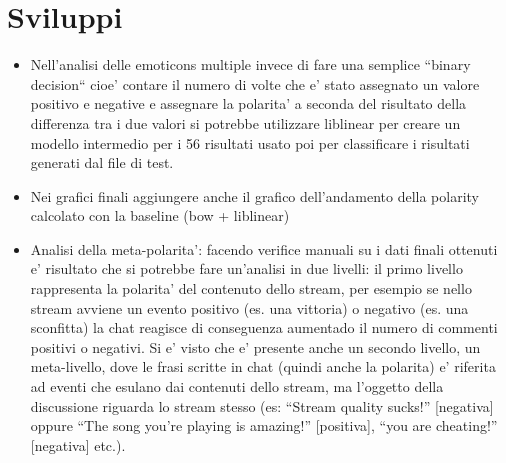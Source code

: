 \documentclass[a4paper,11pt]{book}
\theoremstyle{definition}
\begin{document}
\chapter{Sviluppi}
\label{ch:sviluppi}
\begin{itemize}
\item Nell'analisi delle emoticons multiple invece di fare una semplice ``binary decision`` cioe' contare il numero di volte che e' stato assegnato un valore positivo e negative e assegnare la polarita' a seconda del risultato della differenza tra i due valori si potrebbe utilizzare liblinear per creare un modello intermedio per i 56 risultati usato poi per classificare i risultati generati dal file di test.
\item Nei grafici finali aggiungere anche il grafico dell'andamento della polarity calcolato con la baseline (bow + liblinear)
\item Analisi della meta-polarita': facendo verifice manuali su i dati finali ottenuti e' risultato che si potrebbe fare un'analisi in due livelli: il primo livello rappresenta la polarita' del contenuto dello stream, per esempio se nello stream avviene un evento positivo (es. una vittoria) o negativo (es. una sconfitta) la chat reagisce di conseguenza aumentado il numero di commenti positivi o negativi.
Si e' visto che e' presente anche un secondo livello, un meta-livello, dove le frasi scritte in chat (quindi anche la polarita) e' riferita ad eventi che esulano dai contenuti dello stream, ma l'oggetto della discussione riguarda lo stream stesso (es: ``Stream quality sucks!'' [negativa] oppure ``The song you're playing is amazing!'' [positiva], ``you are cheating!'' [negativa] etc.).
\end{itemize}
\end{document}
